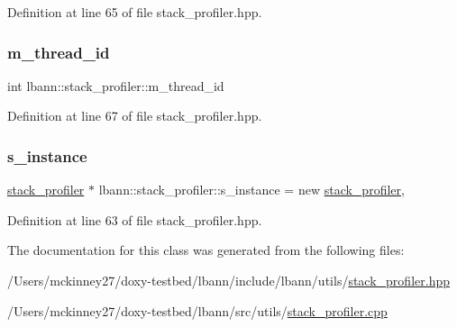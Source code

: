 Definition at line 65 of file stack\+\_\+profiler.\+hpp.

\mbox{\label{classlbann_1_1stack__profiler_a1bd742927294507fe67184cb4f47b86c}} 
\subsubsection{\texorpdfstring{m\+\_\+thread\+\_\+id}{m\_thread\_id}}
{\footnotesize\ttfamily int lbann\+::stack\+\_\+profiler\+::m\+\_\+thread\+\_\+id\hspace{0.3cm}{\ttfamily [private]}}



Definition at line 67 of file stack\+\_\+profiler.\+hpp.

\mbox{\label{classlbann_1_1stack__profiler_a7a1803ee126dfb5a215c5966458451fd}} 
\subsubsection{\texorpdfstring{s\+\_\+instance}{s\_instance}}
{\footnotesize\ttfamily \hyperlink{classlbann_1_1stack__profiler}{stack\+\_\+profiler} $\ast$ lbann\+::stack\+\_\+profiler\+::s\+\_\+instance = new \hyperlink{classlbann_1_1stack__profiler}{stack\+\_\+profiler}\hspace{0.3cm}{\ttfamily [static]}, {\ttfamily [private]}}



Definition at line 63 of file stack\+\_\+profiler.\+hpp.



The documentation for this class was generated from the following files\+:\begin{DoxyCompactItemize}
\item 
/\+Users/mckinney27/doxy-\/testbed/lbann/include/lbann/utils/\hyperlink{stack__profiler_8hpp}{stack\+\_\+profiler.\+hpp}\item 
/\+Users/mckinney27/doxy-\/testbed/lbann/src/utils/\hyperlink{stack__profiler_8cpp}{stack\+\_\+profiler.\+cpp}\end{DoxyCompactItemize}

